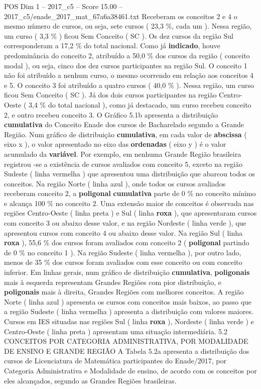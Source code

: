 \begin{textsample}{POS Dim 1 – 2017\_c5 – Score 15.00 – 2017\_c5/enade\_2017\_mat\_67a6a38461.txt}
Receberam os conceitos 2 e 4 o mesmo número de cursos, ou seja, sete cursos ( 23,3 \%, cada um ).
Nessa região, um curso ( 3,3 \% ) ficou Sem Conceito ( SC ).
Os dez cursos da região Sul corresponderam a 17,2 \% do total nacional.
Como já \textbf{indicado}, houve predominância do conceito 2, atribuído a 50,0 \% dos cursos da região ( conceito modal ), ou seja, cinco dos dez cursos participantes na região Sul.
O conceito 1 não foi atribuído a nenhum curso, o mesmo ocorrendo em relação aos conceitos 4 e 5.
O conceito 3 foi atribuído a quatro cursos ( 40,0 \% ).
Nessa região, um curso ficou Sem Conceito ( SC ).
Já dos dois cursos participantes na região Centro-Oeste ( 3,4 \% do total nacional ), como já destacado, um curso recebeu conceito 2, e outro recebeu conceito 3.
O Gráfico 5.1b apresenta a distribuição \textbf{cumulativa} do Conceito Enade dos cursos de Bacharelado segundo a Grande Região.
Num gráfico de distribuição \textbf{cumulativa}, em cada valor de \textbf{abscissa} ( eixo x ), o valor apresentado no eixo das \textbf{ordenadas} ( eixo y ) é o valor acumulado da \textbf{variável}.
Por exemplo, em nenhuma Grande Região brasileira registrou -se a existência de cursos avaliados com conceito 5, exceto na região Sudeste ( linha vermelha ) que apresentou uma distribuição que abarcou todos os conceitos.
Na região Norte ( linha azul ), onde todos os cursos avaliados receberam conceito 2, a \textbf{poligonal} \textbf{cumulativa} parte de 0 \% no conceito mínimo e alcança 100 \% no conceito 2.
Uma extensão maior de conceitos é observada nas regiões Centro-Oeste ( linha preta ) e Sul ( linha \textbf{roxa} ), que apresentaram cursos com conceito 3 ou abaixo desse valor, e na região Nordeste ( linha verde ), que apresentou cursos com conceito 4 ou abaixo desse valor.
Na região Sul ( linha \textbf{roxa} ), 55,6 \% dos cursos foram avaliados com conceito 2 ( \textbf{poligonal} partindo de 0 \% no conceito 1 ).
Na região Sudeste ( linha vermelha ), por outro lado, menos de 35 \% dos cursos foram avaliados com esse conceito ou com conceito inferior.
Em linhas gerais, num gráfico de distribuição \textbf{cumulativa}, \textbf{poligonais} mais à esquerda representam Grandes Regiões com pior distribuição, e \textbf{poligonais} mais à direita, Grandes Regiões com melhores conceitos.
A região Norte ( linha azul ) apresenta os cursos com conceitos mais baixos, ao passo que a região Sudeste ( linha vermelha ) apresenta a distribuição com valores maiores.
Cursos em IES situadas nas regiões Sul ( linha \textbf{roxa} ), Nordeste ( linha verde ) e Centro-Oeste ( linha preta ) apresentam uma situação intermediária. 5.2 CONCEITOS POR CATEGORIA ADMINISTRATIVA, POR MODALIDADE DE ENSINO E GRANDE REGIÃO A Tabela 5.2a apresenta a distribuição dos cursos de Licenciatura de Matemática participantes do Enade/2017, por Categoria Administrativa e Modalidade de ensino, de acordo com os conceitos por eles alcançados, segundo as Grandes Regiões brasileiras.

\end{textsample}
